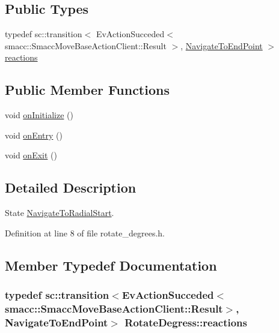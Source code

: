 \subsection*{Public Types}
\begin{DoxyCompactItemize}
\item 
typedef sc\+::transition$<$ Ev\+Action\+Succeded$<$ smacc\+::\+Smacc\+Move\+Base\+Action\+Client\+::\+Result $>$, \hyperlink{structNavigateToEndPoint}{Navigate\+To\+End\+Point} $>$ \hyperlink{structRotateDegress_a63f56a0514b88ff28e0ddc92ef4e79e9}{reactions}
\end{DoxyCompactItemize}
\subsection*{Public Member Functions}
\begin{DoxyCompactItemize}
\item 
void \hyperlink{structRotateDegress_a878b896fa6b7319a56afaff85d8b5285}{on\+Initialize} ()
\item 
void \hyperlink{structRotateDegress_a2839d02188d6cfbd0e16f8eeeb2341b5}{on\+Entry} ()
\item 
void \hyperlink{structRotateDegress_a8974ffddde876cd3e814ddb49c4e1eb0}{on\+Exit} ()
\end{DoxyCompactItemize}


\subsection{Detailed Description}
State \hyperlink{structNavigateToRadialStart}{Navigate\+To\+Radial\+Start}. 

Definition at line 8 of file rotate\+\_\+degrees.\+h.



\subsection{Member Typedef Documentation}
\subsubsection[{\texorpdfstring{reactions}{reactions}}]{\setlength{\rightskip}{0pt plus 5cm}typedef sc\+::transition$<$Ev\+Action\+Succeded$<$smacc\+::\+Smacc\+Move\+Base\+Action\+Client\+::\+Result$>$, {\bf Navigate\+To\+End\+Point}$>$ {\bf Rotate\+Degress\+::reactions}}\hypertarget{structRotateDegress_a63f56a0514b88ff28e0ddc92ef4e79e9}{}\label{structRotateDegress_a63f56a0514b88ff28e0ddc92ef4e79e9}


